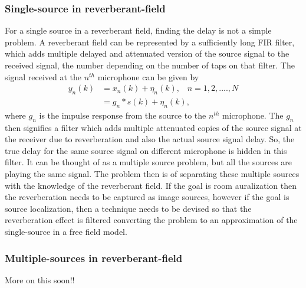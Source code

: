 \subsubsection{Single-source in reverberant-field}

For a single source in a reverberant field, finding the delay is not a simple problem. A reverberant field can be represented by a sufficiently long FIR filter, which adds multiple delayed and attenuated version of the source signal to the received signal, the number depending on the number of taps on that filter. The signal received at the $n^{th}$ microphone can be given by
\begin{equation}
    \begin{split}
         y_n(k) &= x_n(k) + \eta_n(k),\hspace{10pt} n = 1,2,....,N \\
                &= g_n*s(k) + \eta_n(k),
    \end{split}
\end{equation}
where $g_n$ is the impulse response from the source to the $n^{th}$ microphone. 
The $g_n$ then signifies a filter which adds multiple attenuated copies of the source signal at the receiver due to reverberation and also the actual source signal delay. So, the true delay for the same source signal on different microphone is hidden in this filter. It can be thought of as a multiple source problem, but all the sources are playing the same signal. The problem then is of separating these multiple sources with the knowledge of the reverberant field. If the goal is room auralization then the reverberation needs to be captured as image sources, however if the goal is source localization, then a technique needs to be devised so that the reverberation effect is filtered converting the problem to an approximation of the single-source in a free field model. 

\subsubsection{Multiple-sources in reverberant-field}
More on this soon!!